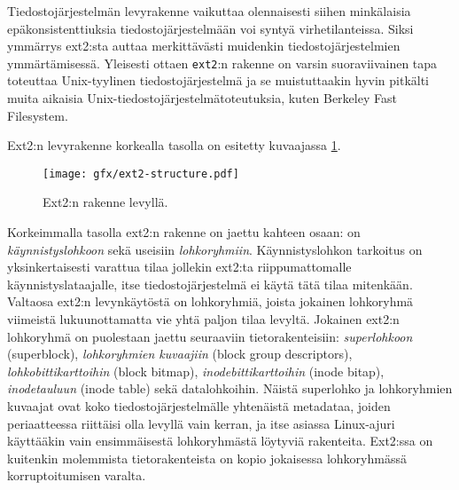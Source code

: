 Tiedostojärjestelmän levyrakenne vaikuttaa olennaisesti siihen minkälaisia epäkonsistenttiuksia tiedostojärjestelmään voi syntyä virhetilanteissa.
Siksi ymmärrys ext2:sta auttaa merkittävästi muidenkin tiedostojärjestelmien ymmärtämisessä.
Yleisesti ottaen \texttt{ext2}:n rakenne on varsin suoraviivainen tapa toteuttaa Unix-tyylinen tiedostojärjestelmä ja se muistuttaakin hyvin pitkälti muita aikaisia Unix-tiedostojärjestelmätoteutuksia, kuten Berkeley Fast Filesystem.

Ext2:n levyrakenne korkealla tasolla on esitetty kuvaajassa \ref{ext2_disk_format}.

\begin{figure}
    \label{ext2_disk_format}
    \centering
    \texttt{[image: gfx/ext2-structure.pdf]}
    \caption{Ext2:n rakenne levyllä.}
\end{figure}

Korkeimmalla tasolla ext2:n rakenne on jaettu kahteen osaan: on \emph{käynnistyslohkoon} sekä useisiin \emph{lohkoryhmiin}.
Käynnistyslohkon tarkoitus on yksinkertaisesti varattua tilaa jollekin ext2:ta riippumattomalle käynnistyslataajalle,
itse tiedostojärjestelmä ei käytä tätä tilaa mitenkään.
Valtaosa ext2:n levynkäytöstä on lohkoryhmiä,
joista jokainen lohkoryhmä viimeistä lukuunottamatta vie yhtä paljon tilaa levyltä.
Jokainen ext2:n lohkoryhmä on puolestaan jaettu seuraaviin tietorakenteisiin:
\emph{superlohkoon} (superblock), 
\emph{lohkoryhmien kuvaajiin} (block group descriptors),
\emph{lohkobittikarttoihin} (block bitmap),
\emph{inodebittikarttoihin} (inode bitap),
\emph{inodetauluun} (inode table) sekä datalohkoihin.
Näistä superlohko ja lohkoryhmien kuvaajat ovat koko tiedostojärjestelmälle yhtenäistä metadataa,
joiden periaatteessa riittäisi olla levyllä vain kerran,
ja itse asiassa Linux-ajuri käyttääkin vain ensimmäisestä lohkoryhmästä löytyviä rakenteita.
Ext2:ssa on kuitenkin molemmista tietorakenteista on kopio jokaisessa lohkoryhmässä korruptoitumisen varalta.

